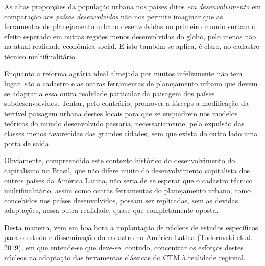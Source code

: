 \documentclass[
	12pt,				%
	oneside,			%
	a4paper,			%
	chapter=TITLE,		%
	section=TITLE,		%
	english,			%
	brazil				%
	]{abntex2}
\begin{document}
As altas proporções da população urbana nos países ditos \emph{em desenvolvimento} em
comparação aos \emph{países desenvolvidos} não nos permite imaginar que as
ferramentas de planejamento urbano desenvolvidas no primeiro mundo surtam o
efeito esperado em outras regiões menos desenvolvidas do globo, pelo menos não
na atual realidade econômica-social. E isto também se aplica, é claro, ao
cadastro técnico multifinalitário.

Enquanto a reforma agrária ideal almejada por muitos infelizmente não tem lugar,
são o cadastro e as outras ferramentas de planejamento urbano que devem se
adaptar a essa outra realidade particular da paisagem dos países
subdesenvolvidos. Tentar, pelo contrário, promover a fórceps a modificação da
terrível paisagem urbana destes locais para que se enquadrem nos modelos
teóricos do mundo desenvolvido passaria, necessariamente, pela expulsão das
classes menos favorecidas das grandes cidades, sem que exista do outro lado uma
porta de saída.

Obviamente, compreendido este contexto histórico do desenvolvimento do
capitalismo no Brasil, que não difere muito do desenvolvimento capitalista dos
outros países da América Latina, não seria de se esperar que o cadastro técnico
multifinalitário, assim como outras ferramentas do planejamento urbano, como
concebidos nos países desenvolvidos, possam ser replicadas, sem as devidas
adaptações, nessa outra realidade, quase que completamente oposta.

Desta maneira, vem em boa hora a implantação de núcleos de estudos específicos
para o estudo e disseminação do cadastro na América Latina (Todorovski et al. \protect\hyperlink{ref-lalan}{2019}), em que
entende-se que deve-se, contudo, concentrar os esforços destes núcleos na
adaptação das ferramentas clássicas do CTM à realidade regional.
\end{document}
